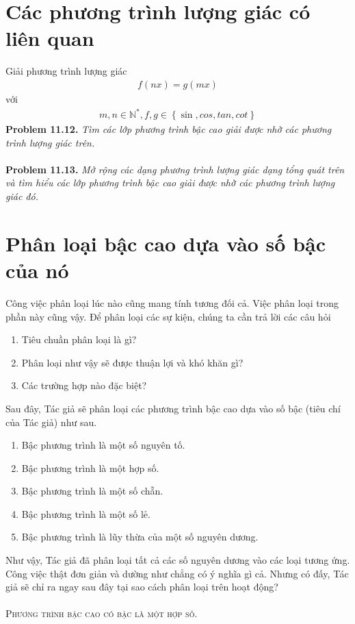 \documentclass[a4paper,oneside]{book}
\numberwithin{equation}{chapter}
\begin{document}
\section{Các phương trình lượng giác có liên quan}
Giải phương trình lượng giác
\begin{align}
f\left( {nx} \right) = g\left( {mx} \right)
\end{align}
với 
\begin{align}
m,n{ \in \mathbb{N} ^*},f,g \in \left\{ {\sin ,cos,tan,cot} \right\}
\end{align}
\textbf{Problem 11.12.} \textit{Tìm các lớp phương trình bậc cao giải được nhờ các phương trình lượng giác trên.}\\
\\
\textbf{Problem 11.13.} \textit{Mở rộng các dạng phương trình lượng giác dạng tổng quát trên và tìm hiểu các lớp phương trình bậc cao giải được nhờ các phương trình lượng giác đó.}
\section{Phân loại bậc cao dựa vào số bậc của nó}
Công việc phân loại lúc nào cũng mang tính tương đối cả. Việc phân loại trong phần này cũng vậy. Để phân loại các sự kiện, chúng ta cần trả lời các câu hỏi
\begin{enumerate}
\item  Tiêu chuần phân loại là gì?
\item  Phân loại như vậy sẽ được thuận lợi và khó khăn gì?
\item  Các trường hợp nào đặc biệt?
\end{enumerate}


Sau đây, Tác giả sẽ phân loại các phương trình bậc cao dựa vào số bậc (tiêu chí của Tác giả) như sau.
\begin{enumerate}
\item Bậc phương trình là một số nguyên tố.
\item Bậc phương trình là một hợp số.
\item Bậc phương trình là một số chẵn.
\item Bậc phương trình là một số lẻ.
\item Bậc phương trình là lũy thừa của một số nguyên dương.
\end{enumerate}

Như vậy, Tác giả đã phân loại tất cả các số nguyên dương vào các loại tương ứng. Công việc thật đơn giản và dường như chẳng có ý nghĩa gì cả. Nhưng có đấy, Tác giả sẽ chỉ ra ngay sau đây tại sao cách phân loại trên hoạt động?\\
\\
\textsc{Phương trình bậc cao có bậc là một hợp số.} 
\end{document}
